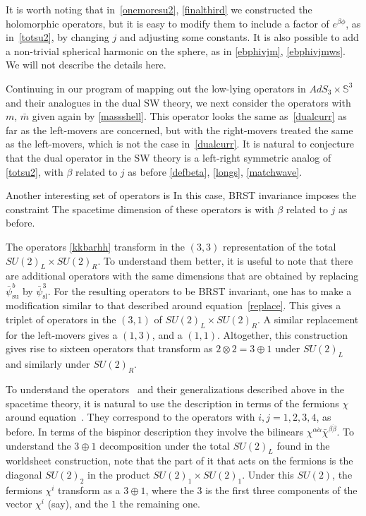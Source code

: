 \documentclass[12pt]{article}
\def\sl{\text{sl}}
\def\su{\text{su}}
\def\ST{{\sst\it\! ST}}
\def\half{\frac12}
\newcommand{\bS}{{\mathbb S}}
\numberwithin{equation}{section}
\def\sst{\scriptscriptstyle}
\def\half{\frac12}
\begin{document}
It is worth noting that in~\eqref{onemoresu2}, \eqref{finalthird} we constructed the holomorphic operators, but it is easy to modify them to include a factor of $e^{\beta\phi}$, as in~\eqref{totsu2}, by changing $j$ and adjusting some constants. It is also possible to add a non-trivial spherical harmonic on the sphere, as in \eqref{ebphivjm}, \eqref{ebphivjmws}. We will not describe the details here. 

Continuing in our program of mapping out the low-lying operators in $AdS_3\times \bS^3$ and their analogues in the dual SW theory, we next consider the operators
\eqn[kkbar]{e^{-\varphi-\bar\varphi}\psi^a_\su\bar\psi^b_\su \Phi_{j;m,\bar m}^{(-1)}}
with $m$, $\bar m$ given again by \eqref{massshell}. 
This operator looks the same as~\eqref{dualcurr} as far as the left-movers are concerned, but with the right-movers treated the same as the left-movers, which is not the case in~\eqref{dualcurr}. It is natural to conjecture that the dual operator in the SW theory is a left-right symmetric analog of \eqref{totsu2}, 
with $\beta$ related to $j$ as before \eqref{defbeta}, \eqref{longs}, \eqref{matchwave}. 

Another interesting set of operators is 
\eqn[kkbarhh]{e^{-\varphi-\bar\varphi}\psi^a_\su\bar\psi^b_\su e^{i(H_\sl+\bar H_\sl)}\Phi_{j;m,\bar m}^{(-1)} ~.}
In this case, BRST invariance imposes the constraint 
The spacetime dimension of these operators is 
\eqn[dimspace]{h_{\ST}=\bar h_{\ST}=-\half\beta(\beta+Q_\ell) +\half}
with $\beta$ related to $j$ as before. 

The operators \eqref{kkbarhh} transform in the $(3,3)$ representation of the total $SU(2)_L\times SU(2)_R$. To understand them better, it is useful to note that there are additional operators with the same dimensions that are obtained by replacing $\bar\psi^b_\su$ by $\bar\psi^3_\sl$. For the resulting operators to be BRST invariant, one has to make a modification similar to that described around equation~\eqref{replace}. 
%
This gives a triplet of operators in the $(3,1)$ of $SU(2)_L\times SU(2)_R$. A similar replacement for the left-movers gives a $(1,3)$, and a $(1,1)$. Altogether, this construction gives rise to sixteen operators that transform as $2\otimes 2=3\oplus1$ under $SU(2)_L$ and similarly under $SU(2)_R$.

To understand the operators \kkbarhh\ and their generalizations described above in the spacetime theory, it is natural to use the description in terms of the fermions $\chi$ around equation~\sofourvec. They correspond to the operators 
with $i,j=1,2,3,4$, as before. In terms of the bispinor description they involve the bilinears
$\chi^{\alpha\dot\alpha}\bar\chi^{\beta\dot\beta}$. To understand the $3\oplus1$ decomposition under the total $SU(2)_L$ found in the worldsheet construction, note that the part of it that acts on the fermions is the diagonal $SU(2)_2$ in the product $SU(2)_1\times SU(2)_1$. Under this $SU(2)$, the fermions $\chi^i$ transform as a $3\oplus1$, where the $3$ is the first three components of the vector $\chi^i$ (say), and the $1$ the remaining one.
\end{document}
